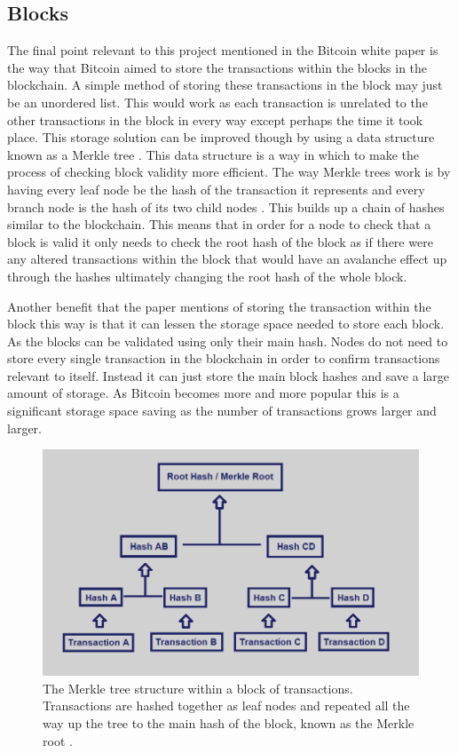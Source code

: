 \documentclass{l4proj}
\begin{document}
\subsection{Blocks}
The final point relevant to this project mentioned in the Bitcoin white paper is the way that Bitcoin aimed to store
the transactions within the blocks in the blockchain. A simple method of storing these transactions in the block may
just be an unordered list. This would work as each transaction is unrelated to the other transactions in the block in
every way except perhaps the time it took place. This storage solution can be improved though by using a data structure
known as a Merkle tree \citep{merkle1987digital}. This data structure is a way in which to make the process of checking block validity
more efficient. The way Merkle trees work is by having every leaf node be the hash of the transaction it represents 
and every branch node is the hash of its two child nodes . This builds up a chain of hashes similar to the blockchain.
This means that in order for a node to check that a block is valid it only needs to check the root hash of the block as
if there were any altered transactions within the block that would have an avalanche effect up through the hashes
ultimately changing the root hash of the whole block.

Another benefit that the paper mentions of storing the transaction within the block this way is that it can lessen
the storage space needed to store each block. As the blocks can be validated using only their main hash. Nodes do 
not need to store every single transaction in the blockchain in order to confirm transactions relevant to itself.
Instead it can just store the main block hashes and save a large amount of storage. As Bitcoin becomes more and
more popular this is a significant storage space saving as the number of transactions grows larger and larger.

\begin{figure}
    \centering
    \includegraphics[width=0.7\linewidth]{images/merkle-tree.png}    

    \caption{
        The Merkle tree structure within a block of transactions. Transactions are hashed together as leaf nodes
        and repeated all the way up the tree to the main hash of the block, known as the Merkle root \citep{merkleimage}.
    }
    \label{fig:merkle}
\end{figure}
\end{document}
